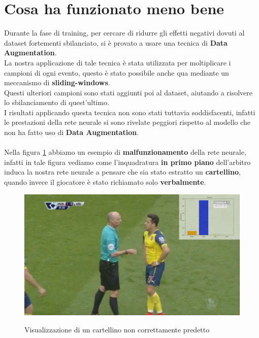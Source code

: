 \section{Cosa ha funzionato meno bene}
Durante la fase di training, per cercare di ridurre gli effetti negativi dovuti al dataset fortementi sbilanciato, si è provato a usare una tecnica di \textbf{Data Augmentation}.
\\La nostra applicazione di tale tecnica è stata utilizzata per moltiplicare i campioni di ogni evento, questo è stato possibile anche qua mediante un meccanismo di \textbf{sliding-windows}.
\\Questi ulteriori campioni sono stati aggiunti poi al dataset, aiutando a risolvere lo sbilanciamento di quest'ultimo.
\\I risultati applicando questa tecnica non sono stati tuttavia soddisfacenti, infatti le prestazioni della rete neurale si sono rivelate peggiori rispetto al modello che non ha fatto uso di \textbf{Data Augmentation}.\\
\\Nella figura \ref{figure : fakecard} abbiamo un esempio di \textbf{malfunzionamento} della rete neurale, infatti in tale figura vediamo come l'inquadratura \textbf{in primo piano} dell'arbitro induca la nostra rete neurale a pensare che sia stato estratto un \textbf{cartellino}, quando invece il giocatore è stato richiamato solo \textbf{verbalmente}.
\begin{figure}[ht]
\centering
\caption{Visualizzazione di un cartellino non correttamente predetto}
\includegraphics[width=\linewidth]{img/fakecard.png}
\label{figure : fakecard}
\end{figure}
